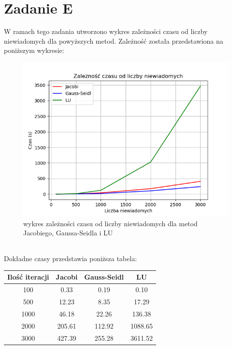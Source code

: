 \documentclass{article} %
\begin{document}
\section{Zadanie E}
W ramach tego zadania utworzono wykres zależności czasu od liczby niewiadomych dla powyższych metod. Zależność została przedstawiona na poniższym wykresie: \\
\begin{figure}[h]
    \centering
    \includegraphics[scale=0.7]{wykres.png}
    \caption{ wykres zależności czasu od liczby niewiadomych dla metod Jacobiego, Gaussa-Seidla i LU}
\end{figure} \\
Dokładne czasy przedstawia poniższa tabela:
\begin{center} 
    \begin{tabular}  { | c | c | c | c |  }
        \hline
       Ilość iteracji & Jacobi & Gauss-Seidl & LU \\
       \hline
       100 & 0.33 & 0.19 & 0.10\\
       \hline
       500 & 12.23 & 8.35 & 17.29 \\
       \hline
       1000 & 46.18 & 22.26 & 136.38 \\
       \hline
       2000 & 205.61 & 112.92 & 1088.65 \\
       \hline
       3000 & 427.39 & 255.28 & 3611.52 \\
       \hline
    \end{tabular}
\end{center}
\end{document}
